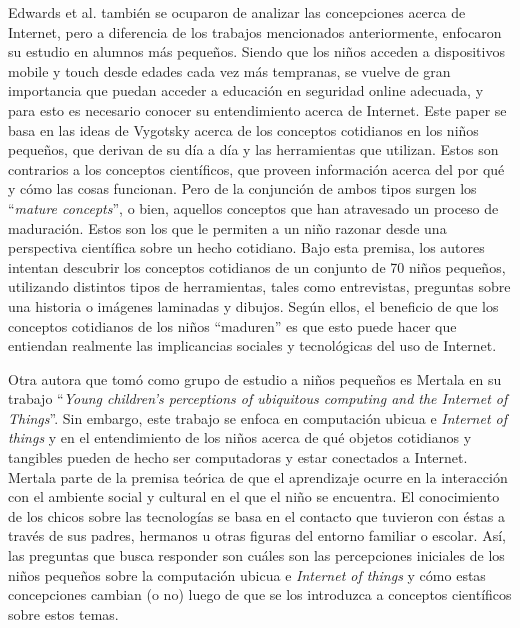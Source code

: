 Edwards et al. \cite{edwards} también se ocuparon de analizar las concepciones acerca de Internet, pero a diferencia de los trabajos mencionados anteriormente, enfocaron su estudio en alumnos más pequeños. Siendo que los niños acceden a dispositivos mobile y touch desde edades cada vez más tempranas, se vuelve de gran importancia que puedan acceder a educación en seguridad online adecuada, y para esto es necesario conocer su entendimiento acerca de Internet. Este paper se basa en las ideas de Vygotsky \cite{vygotsky} acerca de los conceptos cotidianos en los niños pequeños, que derivan de su día a día y las herramientas que utilizan. Estos son contrarios a los conceptos científicos, que proveen información acerca del por qué y cómo las cosas funcionan. Pero de la conjunción de ambos tipos surgen los ``\textit{mature concepts}'', o bien, aquellos conceptos que han atravesado un proceso de maduración. Estos son los que le permiten a un niño razonar desde una perspectiva científica sobre un hecho cotidiano. Bajo esta premisa, los autores intentan descubrir los conceptos cotidianos de un conjunto de 70 niños pequeños, utilizando distintos tipos de herramientas, tales como entrevistas, preguntas sobre una historia o imágenes laminadas y  dibujos. Según ellos, el beneficio de que los conceptos cotidianos de los niños “maduren” es que esto puede hacer que entiendan realmente las implicancias sociales y tecnológicas del uso de Internet.

Otra autora que tomó como grupo de estudio a niños pequeños es Mertala \cite{mertala} en su trabajo ``\textit{Young children's perceptions of ubiquitous computing and the Internet of Things}''. Sin embargo, este trabajo se enfoca en computación ubicua e \textit{Internet of things} y en el entendimiento de los niños acerca de qué objetos cotidianos y tangibles pueden de hecho ser computadoras y estar conectados a Internet. Mertala parte de la premisa teórica de que el aprendizaje ocurre en la interacción con el ambiente social y cultural en el que el niño se encuentra. El conocimiento de los chicos sobre las tecnologías se basa en el contacto que tuvieron con éstas a través de sus padres, hermanos u otras figuras del entorno familiar o escolar. Así, las preguntas que busca responder son cuáles son las percepciones iniciales de los niños pequeños sobre la computación ubicua e \textit{Internet of things} y cómo estas concepciones cambian (o no) luego de que se los introduzca a conceptos científicos sobre estos temas.

